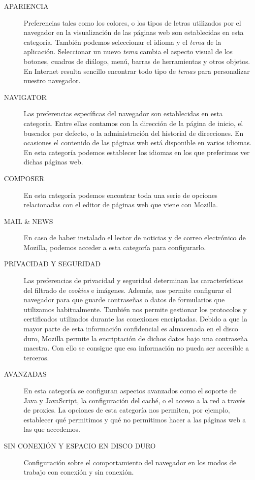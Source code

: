 \begin{description}

\item[APARIENCIA] Preferencias tales como los  colores, o los tipos de
letras utilizados por el navegador  en la visualización de las páginas
web son establecidas en esta categoría. También podemos seleccionar el
idioma y  el {\em tema}  de la  aplicación. Seleccionar un  nuevo {\em
tema} cambia  el aspecto  visual de los  botones, cuadros  de diálogo,
menú,  barras de  herramientas y  otros objetos.  En Internet  resulta
sencillo encontrar todo tipo de  {\em temas} para personalizar nuestro
navegador.

\item[NAVIGATOR]  Las  preferencias   específicas  del  navegador  son
establecidas en esta categoría. Entre  ellas contamos con la dirección
de la página  de inicio, el buscador por defecto,  o la administración
del historial de direcciones. En ocasiones el contenido de las páginas
web  está disponible  en  varios idiomas.  En  esta categoría  podemos
establecer los idiomas en los que preferimos ver dichas páginas web.

\item[COMPOSER] En esta categoría podemos  encontrar toda una serie de
opciones  relacionadas con  el editor  de  páginas web  que viene  con
{\sf Mozilla}.

\item[MAIL \& NEWS] En caso de haber instalado el lector de noticias y
de  correo  electrónico  de  {\sf Mozilla},  podemos  acceder  a  esta
categoría para configurarlo.

\item[PRIVACIDAD  Y  SEGURIDAD]  Las   preferencias  de  privacidad  y
seguridad  determinan   las  características  del  filtrado   de  {\em
cookies}  e  imágenes. Además,  nos  permite  configurar el  navegador
para  que guarde  contraseñas o  datos de  formularios que  utilizamos
habitualmente.  También   nos  permite  gestionar  los   protocolos  y
certificados utilizados  durante las conexiones encriptadas.  Debido a
que la mayor  parte de esta información confidencial  es almacenada en
el disco duro,  {\sf Mozilla} permite la encriptación  de dichos datos
bajo una contraseña maestra. Con  ello se consigue que esa información
no pueda ser accesible a terceros.

\item[AVANZADAS] En  esta categoría  se configuran  aspectos avanzados
como el soporte de {\sf Java} y {\sf JavaScript}, la configuración del
caché, o el acceso  a la red a través de proxies.  La opciones de esta
categoría nos permiten,  por ejemplo, establecer qué  permitimos y qué
no permitimos hacer a las páginas web a las que accedemos.

\item[SIN CONEXIÓN  Y ESPACIO  EN DISCO  DURO] Configuración  sobre el
comportamiento del  navegador en los  modos de trabajo con  conexión y
sin conexión.

\end{description}

